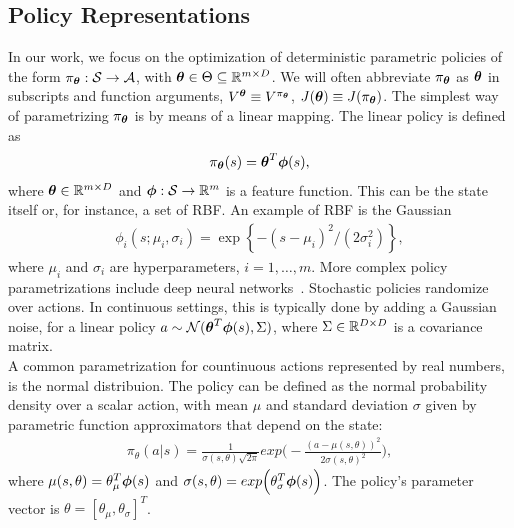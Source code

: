 \subsection{Policy Representations} \label{subsec:polrep}
In our work, we focus on the optimization of deterministic parametric policies of the form $\pi_{\boldsymbol{\theta}}:\mathcal{S}\to\mathcal{A}$, with $\boldsymbol{\theta}\in\Theta\subseteq\mathbb{R}^{m\times D}$. We will often abbreviate $\pi_{\boldsymbol{\theta}}$ as $\boldsymbol{\theta}$ in subscripts and function arguments, \eg $V^{\boldsymbol{\theta}} \equiv V^{\pi_{\boldsymbol{\theta}}}$, $J(\boldsymbol{\theta}) \equiv J(\pi_{\boldsymbol{\theta}})$. The simplest way of parametrizing $\pi_{\boldsymbol{\theta}}$ is by means of a linear mapping. The linear policy is defined as 
\begin{align} \pi_{\boldsymbol{\theta}}(s) = \boldsymbol{\theta}^T\boldsymbol{\phi}(s), \end{align} where $\boldsymbol{\theta}\in\mathbb{R}^{m\times D}$ and $\boldsymbol{\phi}:\mathcal{S}\to\mathbb{R}^m$ is a feature function. This can be the state itself or, for instance, a set of \acf{RBF}. An example of RBF is the Gaussian
\begin{align} \phi_i(s; \mu_i, \sigma_i) = \exp\left\{-{(s -\mu_i)^2}\big/{(2\sigma_i^2)}\right\}, \end{align}
where $\mu_i$ and $\sigma_i$ are hyperparameters, $i=1,\dots,m$. More complex policy parametrizations include deep neural networks~\citep{duan2016benchmarking}. 
Stochastic policies randomize over actions. In continuous settings, this is typically done by adding a Gaussian noise, \eg for a linear policy $a\sim\mathcal{N}(\boldsymbol{\theta}^T\boldsymbol{\phi}(s),\Sigma)$, where $\Sigma\in\mathbb{R}^{D\times D}$ is a covariance matrix.\\
\newline
A common parametrization for countinuous actions represented by real numbers, is the normal distribuion. The policy can be defined as the normal probability density over a scalar action, with mean $\mu$ and standard deviation $\sigma$ given by parametric function approximators that depend on the state:
\begin{align} \pi_{\theta}(a|s) = \frac{1}{\sigma(s, \theta)\sqrt{2\pi}}exp\Big( -\frac{(a -\mu(s, \theta))^2}{2\sigma(s, \theta)^2}\Big), \end{align}
where $\mu(s, \theta) = \theta_{\mu}^{T} \boldsymbol{\phi}(s)$ and $\sigma(s, \theta) = exp\Big( \theta_{\sigma}^{T}\boldsymbol{\phi}(s) \Big)$. The policy's parameter vector is $\theta = [\theta_{\mu}, \theta_{\sigma}]^{T}$. 

